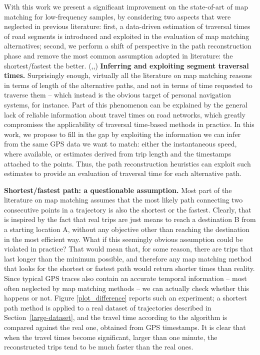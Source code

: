 \documentclass[5p]{elsarticle}
\begin{document}
With this work we present a significant improvement on the state-of-art of map matching for low-frequency samples, by considering two aspects that were neglected in previous literature: first, a data-driven estimation of traversal times of road segments is introduced and exploited in the evaluation of map matching alternatives; second, we perform a shift of perspective in the path reconstruction phase and remove the most common assumption adopted in literature:
 the shortest/fastest the better. (\cite{newson2009hidden},\cite{tang2012efficient},\cite{yuan2010interactive})
{\bf Inferring and exploiting segment traversal times.}
Surprisingly enough, virtually all the literature on map matching reasons in terms of length of the alternative paths, and not in terms of time requested to traverse them -- which instead is the obvious target of personal navigation systems, for instance.
Part of this phenomenon can be explained by the general lack of reliable information about travel times on road networks, which greatly compromises the applicability of traversal time-based methods in practice.
In this work, we propose to fill in the gap by exploiting the information we can infer from the same GPS data we want to match: either the instantaneous speed, where available, or estimates derived from trip length and the timestamps attached to the points.
Thus, the path reconstruction heuristics can exploit such estimates to provide an evaluation of traversal time for each alternative path.

{\bf Shortest/fastest path: a questionable assumption.}
Most part of the literature on map matching assumes that the most likely path connecting two consecutive points in a trajectory is also the shortest or the fastest.
Clearly, that is inspired by the fact that real trips are just means to reach a destination B from a starting location A, without any objective other than reaching the destination in the most efficient way.
What if this seemingly obvious assumption could be violated in practice?
That would mean that, for some reason, there are trips that last longer than the minimum possible, and therefore any map matching method that looks for the shortest or fastest path would return shorter times than reality.
Since typical GPS traces also contain an accurate temporal information -- most often neglected by map matching methods -- we can actually check whether this happens or not.
Figure \ref{plot_difference} reports such an experiment; a shortest path method is applied to a real dataset of trajectories described in Section~\ref{large-dataset}, 
and the travel time according to the algorithm is compared against the real one, obtained from GPS timestamps.
It is clear that when the travel times become significant, larger than one minute, the reconstructed trips tend to be much faster than the real ones.
\end{document}
